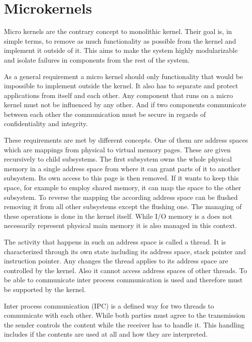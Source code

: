 \documentclass[
a4paper,
12pt,
notitlepage,
parskip=half,
DIV=11,
]{scrbook}
\begin{document}
		\section{Microkernels}
		
		Micro kernels are the contrary concept to monolithic kernel.
		Their goal is, in simple terms, to remove as much functionality as possible from the kernel and implement it outside of it.
		This aims to make the system highly modularizable and isolate failures in components from the rest of the system.
		
		As a general requirement a micro kernel should only functionality that would be impossible to implement outside the kernel.
		It also has to separate and protect applications from itself and each other.
		Any component that runs on a micro kernel must not be influenced by any other. And if two components communicate between each other the communication must be secure in regards of confidentiality and integrity.
		
		These requirements are met by different concepts.
		One of them are address spaces which are mappings from physical to virtual memory pages.
		These are given recursively to child subsystems.
		The first subsystem owns the whole physical memory in a single address space from where it can grant parts of it to another subsystem.
		Its own access to this page is then removed.
		If it wants to keep this space, for example to employ shared memory, it can map the space to the other subsystem.
		To reverse the mapping the according address space can be flushed removing it from all other subsystems except the flushing one.
		The managing of these operations is done in the kernel itself.
		While I/O memory is a does not necessarily represent physical main memory it is also managed in this context.
		
		The activity that happens in such an address space is called a thread.
		It is characterized through its own state including its address space, stack pointer and instruction pointer.
		Any changes the thread applies to its address space are controlled by the kernel.
		Also it cannot access address spaces of other threads.
		To be able to communicate inter process communication is used and therefore must be supported by the kernel.
		
		Inter process communication (IPC) is a defined way for two threads to communicate with each other.
		While both parties must agree to the transmission the sender controls the content while the receiver has to handle it.
		This handling includes if the contents are used at all and how they are interpreted.
		
\end{document}
